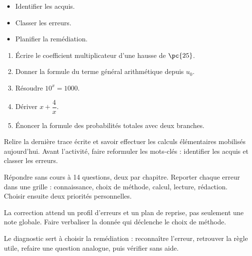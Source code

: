 \begin{objectives}\begin{itemize}\item Identifier les acquis.\item Classer les erreurs.\item Planifier la remédiation.\end{itemize}\end{objectives}
\begin{fluency}\begin{enumerate}\item Écrire le coefficient multiplicateur d'une hausse de $\pc{25}$. \item Donner la formule du terme général arithmétique depuis $u_0$. \item Résoudre $10^x=1000$. \item Dériver $x+\dfrac4x$. \item Énoncer la formule des probabilités totales avec deux branches. \end{enumerate}\end{fluency}
\begin{prerequisites}Relire la dernière trace écrite et savoir effectuer les calculs élémentaires mobilisés aujourd'hui. Avant l'activité, faire reformuler les mots-clés : identifier les acquis et classer les erreurs.\end{prerequisites}

\begin{activity}
Répondre sans cours à 14 questions, deux par chapitre. Reporter chaque erreur dans une grille : connaissance, choix de méthode, calcul, lecture, rédaction. Choisir ensuite deux priorités personnelles.

\end{activity}
\begin{solution}La correction attend un profil d'erreurs et un plan de reprise, pas seulement une note globale. Faire verbaliser la donnée qui déclenche le choix de méthode.\end{solution}

\begin{summary}Le diagnostic sert à choisir la remédiation : reconnaître l'erreur, retrouver la règle utile, refaire une question analogue, puis vérifier sans aide.\end{summary}

